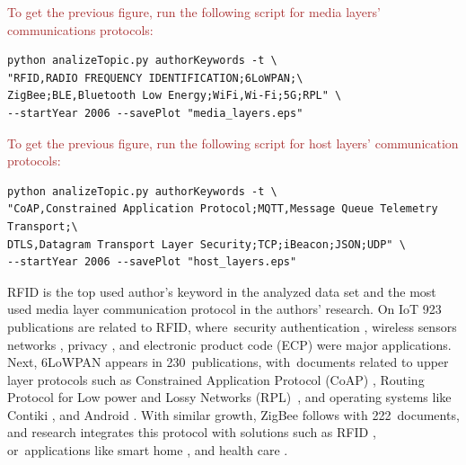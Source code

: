 \documentclass[symmetry,article,accept,moreauthors,pdftex10pt,a4paper]{mdpi}
\begin{document}
\noindent
\textcolor{brown}{To get the previous figure, run the following script for media layers' communications protocols:}\\
\begin{verbatim}
python analizeTopic.py authorKeywords -t \
"RFID,RADIO FREQUENCY IDENTIFICATION;6LoWPAN;\
ZigBee;BLE,Bluetooth Low Energy;WiFi,Wi-Fi;5G;RPL" \
--startYear 2006 --savePlot "media_layers.eps"
\end{verbatim}

\noindent
\textcolor{brown}{To get the previous figure, run the following script for host layers' communication protocols:}\\
\begin{verbatim}
python analizeTopic.py authorKeywords -t \
"CoAP,Constrained Application Protocol;MQTT,Message Queue Telemetry Transport;\
DTLS,Datagram Transport Layer Security;TCP;iBeacon;JSON;UDP" \
--startYear 2006 --savePlot "host_layers.eps"
\end{verbatim}



RFID is the top used author's keyword in the analyzed data set and the most used media layer communication protocol in the authors' research. On IoT 923 publications are related to RFID, where~security authentication \cite{Yuan2016,Li20124971,Li2016}, wireless sensors networks \cite{Hamza2016267,6322530}, privacy \cite{Wu20151224,Burmester2014317}, and electronic product code (ECP) \cite{Yan201255,Xu201140} were major applications. Next, 6LoWPAN appears in 230~publications, with~documents related to upper layer protocols such as Constrained Application Protocol (CoAP) \cite{Castellani201471,Bimschas2012}, Routing Protocol for Low power and Lossy Networks (RPL)~\cite{Pongle2015,Hellaoui201525}, and operating systems like Contiki \cite{Bragg20161273,Caputo2012770}, and Android \cite{Wang201549,Schleiss201214}. With similar growth, ZigBee follows with 222~documents, and research integrates this protocol with solutions such as RFID \cite{Fan2012732,Alharbe2013191,zhang2014}, or~applications like smart home \cite{Yiqi2014114,Yi2016128,wang2013}, and health care \cite{Kodali2016411,Spano20165452,Rosner201444}.
\end{document}
